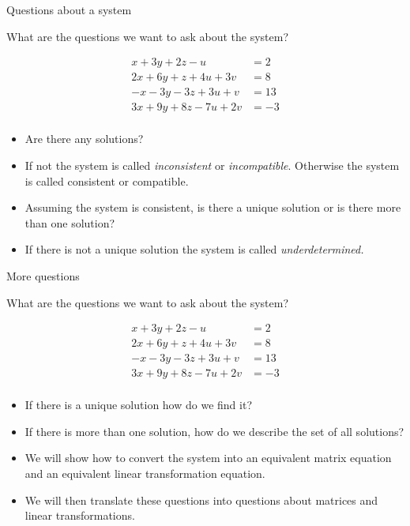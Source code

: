 \documentclass[handout]{beamer}
\begin{document}
\begin{frame}{Questions about a system}

What are the questions we want to ask about the system?

\begin{align*}
 x + 3y + 2z - u  \qquad &= 2 \\
2x + 6y + z + 4u + 3v  &= 8 \\
-x -3y  -3z + 3u + v  &= 13 \\
3x + 9y + 8z  -7u + 2v  &= -3 \\
\end{align*}

\begin{itemize}
\item Are there any solutions?
\item If not the system is called \emph{inconsistent}
or \emph{incompatible}. Otherwise the system is called consistent or compatible.
\item Assuming the system is consistent, is there a unique solution or is there
more than one solution?
\item If there is not a unique solution the system is
called \emph{underdetermined.}
\end{itemize}

\end{frame}

\begin{frame}{More questions}

What are the questions we want to ask about the system?

\begin{align*}
 x + 3y + 2z - u  \qquad &= 2 \\
2x + 6y + z + 4u + 3v  &= 8 \\
-x -3y  -3z + 3u + v  &= 13 \\
3x + 9y + 8z  -7u + 2v  &= -3 \\
\end{align*}

\begin{itemize}
\item If there is a unique solution how do we find it?
\item If there is more than one solution, how do we describe the set of
all solutions?
\item We will show how to convert the system into an equivalent
matrix equation and an equivalent linear transformation equation.
\item We will then translate these questions into questions about
matrices and linear transformations.
\end{itemize}

\end{frame}
\end{document}
